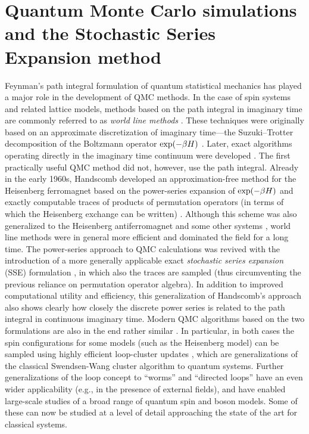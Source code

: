 \documentclass[draft,numberedheadings]{aipproc}
\begin{document}
\section{Quantum Monte Carlo simulations and the Stochastic 
Series Expansion method}
\label{sec_sse}

Feynman's path integral formulation of quantum statistical mechanics \cite{feynman53} has played a major role in the development of QMC methods. In the case 
of spin systems and related lattice models, methods based on the path integral in imaginary time are commonly referred to as {\it world line methods} 
\cite{hirsch82}. These techniques were originally based on an approximate discretization of imaginary time---the Suzuki--Trotter decomposition of the 
Boltzmann operator ${\rm exp}({-\beta H})$ \cite{suzuki76,suzuki77}. Later, exact algorithms operating directly in the imaginary time continuum 
were developed \cite{beard,prokofev96}. The first practically useful QMC method did not, however, use the path integral. Already in the early 1960s, 
Handscomb developed an approximation-free method for the Heisenberg ferromagnet based on the power-series expansion of ${\rm exp}({-\beta H})$
and exactly computable traces of products of permutation operators (in terms of which the Heisenberg exchange can be written) \cite{handscomb62,handscomb64}. 
Although this scheme was also generalized to the Heisenberg antiferromagnet \cite{lyklema82,lee84,manousakis89} and some other systems \cite{chakravarty82}, 
world line methods were in general more efficient and dominated the field for a long time. The power-series approach to QMC calculations was revived with 
the introduction of a more generally applicable exact {\it stochastic series expansion} (SSE) formulation \cite{sandvik90,sandvik92}, in which 
also the traces are sampled (thus circumventing the previous reliance on permutation operator algebra). In addition to improved computational utility and efficiency, 
this generalization of Handscomb's approach also shows clearly how closely the discrete power series is related to the path integral in continuous imaginary 
time. Modern QMC algorithms based on the two formulations are also in the end rather similar \cite{syljuasen02,evertz1}. In particular, in both cases the 
spin configurations for some models (such as the Heisenberg model) can be sampled using highly efficient loop-cluster updates \cite{ying93,kawashima94,beard,sandvik99a}, 
which are generalizations \cite{evertz93} of  the classical Swendsen-Wang \cite{swendsenwang} cluster algorithm to quantum systems. Further generalizations of 
the loop concept to ``worms'' \cite{prokofev96} and ``directed loops'' \cite{sandvik99a,syljuasen02} have an even wider applicability (e.g., in the presence of 
external fields), and have enabled large-scale studies of a broad range of quantum spin and boson models. Some of these can now be studied at a level of detail 
approaching the state of the art for classical systems. 
\end{document}
